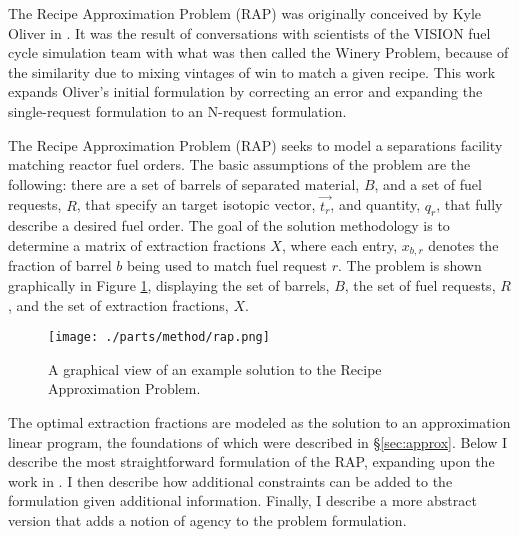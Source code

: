 The Recipe Approximation Problem (RAP) was originally conceived by Kyle Oliver
in \cite{oliver_geniusv2:_2009}. It was the result of conversations with
scientists of the VISION fuel cycle simulation team \cite{vision2009} with what
was then called the Winery Problem, because of the similarity due to mixing
vintages of win to match a given recipe. This work expands Oliver's initial
formulation by correcting an error and expanding the single-request formulation
to an N-request formulation.

The Recipe Approximation Problem (RAP) seeks to model a separations facility
matching reactor fuel orders. The basic assumptions of the problem are the
following: there are a set of barrels of separated material, $B$, and a set of
fuel requests, $R$, that specify an target isotopic vector, $\vec{t_{r}}$, and
quantity, $q_{r}$, that fully describe a desired fuel order. The goal of the
solution methodology is to determine a matrix of extraction fractions $X$, where
each entry, $x_{b,r}$ denotes the fraction of barrel $b$ being used to match
fuel request $r$. The problem is shown graphically in Figure \ref{fig:rap},
displaying the set of barrels, $B$, the set of fuel requests, $R$, and the set
of extraction fractions, $X$.

\begin{figure}[h]
  \begin{center}
    \texttt{[image: ./parts/method/rap.png]}
  \caption{A graphical view of an example solution to the Recipe Approximation 
           Problem.}
  \label{fig:rap}
  \end{center}
\end{figure}

The optimal extraction fractions are modeled as the solution to an
approximation linear program, the foundations of which were described in
\S\ref{sec:approx}. Below I describe the most straightforward formulation of 
the RAP, expanding upon the work in \cite{oliver_geniusv2:_2009}. I then
describe how additional constraints can be added to the formulation given
additional information. Finally, I describe a more abstract version that adds a
notion of agency to the problem formulation.
